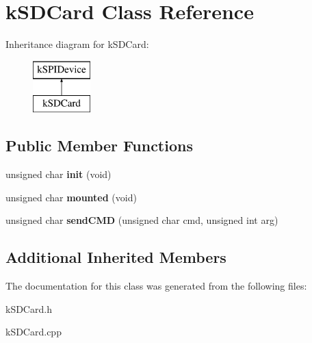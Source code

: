 \hypertarget{classkSDCard}{}\section{k\+S\+D\+Card Class Reference}
\label{classkSDCard}
Inheritance diagram for k\+S\+D\+Card\+:\begin{figure}[H]
\begin{center}
\leavevmode
\includegraphics[height=2.000000cm]{classkSDCard}
\end{center}
\end{figure}
\subsection*{Public Member Functions}
\begin{DoxyCompactItemize}
\item 
unsigned char {\bfseries init} (void)\hypertarget{classkSDCard_a09af8bfa22e0e4f4c62ae38b14a5842e}{}\label{classkSDCard_a09af8bfa22e0e4f4c62ae38b14a5842e}

\item 
unsigned char {\bfseries mounted} (void)\hypertarget{classkSDCard_a6e9f64bf6068b7e58b539e7bbcaa03d2}{}\label{classkSDCard_a6e9f64bf6068b7e58b539e7bbcaa03d2}

\item 
unsigned char {\bfseries send\+C\+MD} (unsigned char cmd, unsigned int arg)\hypertarget{classkSDCard_a91c717f5da5833e685325bdd41cbba1f}{}\label{classkSDCard_a91c717f5da5833e685325bdd41cbba1f}

\end{DoxyCompactItemize}
\subsection*{Additional Inherited Members}


The documentation for this class was generated from the following files\+:\begin{DoxyCompactItemize}
\item 
k\+S\+D\+Card.\+h\item 
k\+S\+D\+Card.\+cpp\end{DoxyCompactItemize}
